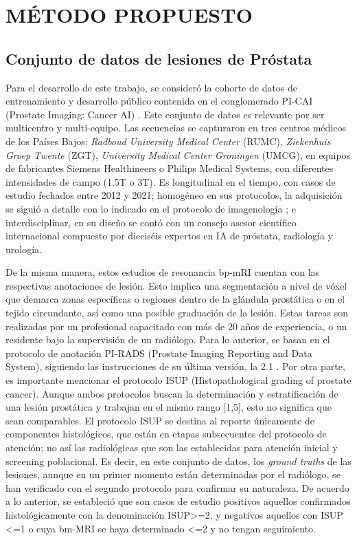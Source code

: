 \chapter{MÉTODO PROPUESTO}


\section{Conjunto de datos de lesiones de Próstata}

Para el desarrollo de este trabajo, se consideró la cohorte de datos de entrenamiento y desarrollo público \cite{Picai_dataset} contenida en el conglomerado PI-CAI (Prostate Imaging: Cancer AI) \cite{PICAI_BIAS}. Este conjunto de datos es relevante por ser multicentro y multi-equipo. Las secuencias se capturaron en tres centros médicos de los Países Bajos: \textit{Radboud University Medical Center} (RUMC), \textit{Ziekenhuis Groep Twente} (ZGT), \textit{University Medical Center Groningen} (UMCG), en equipos de fabricantes Siemens Healthineers o Philips Medical Systems, con diferentes intensidades de campo (1.5T o 3T). Es longitudinal en el tiempo, con casos de estudio fechados entre 2012 y 2021; homogéneo en sus protocolos, la adquisición se siguió a detalle con lo indicado en el protocolo de imagenología \cite{Engels2020}; e interdisciplinar, en su diseño se contó con un consejo asesor científico internacional compuesto por dieciséis expertos en IA de próstata, radiología y urología.

De la misma manera, estos estudios de resonancia bp-mRI cuentan con las respectivas anotaciones de lesión. Esto implica una segmentación a nivel de vóxel que demarca zonas específicas o regiones dentro de la glándula prostática o en el tejido circundante, así como una posible graduación de la lesión. Estas tareas son realizadas por un profesional capacitado con más de 20 años de experiencia, o un residente bajo la supervisión de un radiólogo. Para lo anterior, se basan en el protocolo de anotación PI-RADS (Prostate Imaging Reporting and Data System), siguiendo las instrucciones de su última versión, la 2.1 \cite{Scott2021}. Por otra parte, es importante mencionar el protocolo ISUP (Histopathological grading of prostate cancer). Aunque ambos protocolos buscan la determinación y estratificación de una lesión prostática y trabajan en el mismo rango [1,5], esto no significa que sean comparables. El protocolo ISUP se destina al reporte únicamente de componentes histológicos, que están en etapas subsecuentes del protocolo de atención; no así las radiológicas que son las establecidas para atención inicial y screening poblacional. Es decir, en este conjunto de datos, los \textit{ground truths} de las lesiones, aunque en un primer momento están determinadas por el radiólogo, se han verificado con el segundo protocolo para confirmar su naturaleza. De acuerdo a lo anterior, se estableció que son casos de estudio positivos aquellos confirmados histológicamente con la denominación ISUP>=2, y negativos aquellos con ISUP <=1 o cuya bm-MRI se haya determinado <=2 y no tengan seguimiento.

